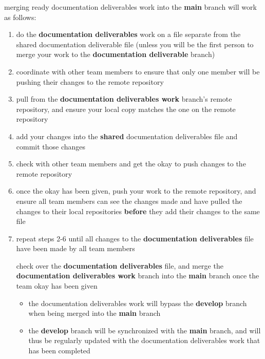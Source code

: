 \documentclass{article}
\begin{document}
\begin{itemize}
  \begin{item}
    merging ready documentation deliverables work into the \textbf{main} branch will work as follows:
    \begin{enumerate}
      \item do the \textbf{documentation deliverables} work on a file separate from the shared documentation deliverable file (unless you will be the first person to merge your work to the \textbf{documentation deliverable} branch)
      \item coordinate with other team members to ensure that only one member will be pushing their changes to the remote repository
      \item pull from the \textbf{documentation deliverables work} branch’s remote repository, and ensure your local copy matches the one on the remote repository
      \item add your changes into the \textbf{shared} documentation deliverables file and commit those changes
      \item check with other team members and get the okay to push changes to the remote repository
      \item once the okay has been given, push your work to the remote repository, and ensure all team members can see the changes made and have pulled the changes to their local repositories \textbf{before} they add their changes to the same file
      \item repeat steps 2-6 until all changes to the \textbf{documentation deliverables} file have been made by all team members
      \begin{item}
        check over the \textbf{documentation deliverables} file, and merge the \textbf{documentation deliverables work} branch into the \textbf{main} branch once the team okay has been given
        \begin{itemize}
          \item the documentation deliverables work will bypass the \textbf{develop} branch when being merged into the \textbf{main} branch
          \item the \textbf{develop} branch will be synchronized with the \textbf{main} branch, and will thus be regularly updated with the documentation deliverables work that has been completed
        \end{itemize}
      \end{item}
    \end{enumerate}
  \end{item}
\end{itemize}
\end{document}
